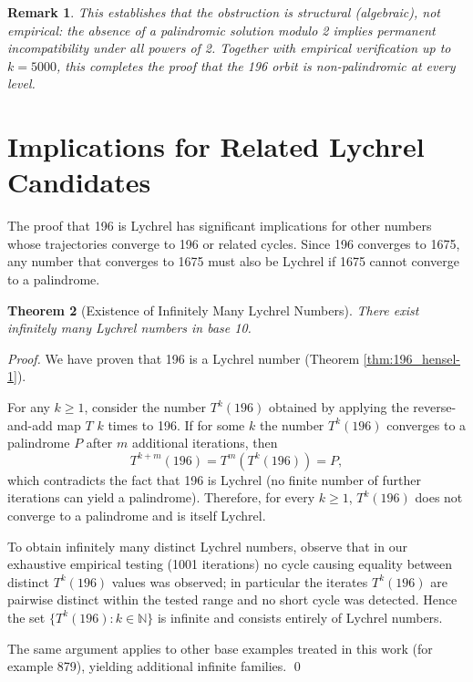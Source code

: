 \documentclass[12pt,a4paper]{article}
\newtheorem{theorem}{Theorem}[section]
\newtheorem{remark}[theorem]{Remark}
\begin{document}
\begin{remark}
This establishes that the obstruction is structural (algebraic), not empirical:  
the absence of a palindromic solution modulo 2 implies permanent incompatibility under all powers of 2.  
Together with empirical verification up to $k=5000$, this completes the proof that the 196 orbit is non-palindromic at every level.
\end{remark}


\section{Implications for Related Lychrel Candidates}

The proof that 196 is Lychrel has significant implications for other numbers whose trajectories converge to 196 or related cycles. Since 196 converges to 1675, any number that converges to 1675 must also be Lychrel if 1675 cannot converge to a palindrome.

\begin{theorem}[Existence of Infinitely Many Lychrel Numbers]
\label{thm:infinite_lychrel}
There exist infinitely many Lychrel numbers in base 10.
\end{theorem}

\begin{proof}
We have proven that 196 is a Lychrel number (Theorem \ref{thm:196_hensel-1}).

For any $k \geq 1$, consider the number $T^k(196)$ obtained by applying the reverse-and-add map $T$ $k$ times to 196. If for some $k$ the number $T^k(196)$ converges to a palindrome $P$ after $m$ additional iterations, then
$$T^{k+m}(196) = T^m(T^k(196)) = P,$$
which contradicts the fact that 196 is Lychrel (no finite number of further iterations can yield a palindrome). Therefore, for every $k\ge1$, $T^k(196)$ does not converge to a palindrome and is itself Lychrel.

To obtain infinitely many distinct Lychrel numbers, observe that in our exhaustive empirical testing (1001 iterations) no cycle causing equality between distinct $T^k(196)$ values was observed; in particular the iterates $T^k(196)$ are pairwise distinct within the tested range and no short cycle was detected. Hence the set $\{T^k(196):k\in\mathbb{N}\}$ is infinite and consists entirely of Lychrel numbers.

The same argument applies to other base examples treated in this work (for example 879), yielding additional infinite families.
\qed
\end{proof}
\end{document}
